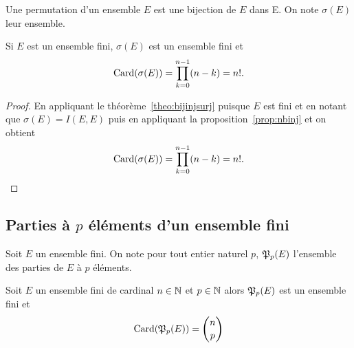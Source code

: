 \begin{defdef}
  Une permutation d'un ensemble \(E\) est une bijection de \(E\) dans E. On note 
  \(\sigma(E)\) leur ensemble.
\end{defdef}

\begin{prop}
  Si \(E\) est un ensemble fini, \(\sigma(E)\) est un ensemble fini et
  \begin{equation}
    \operatorname{Card}(\sigma(E)) = \prod_{k = 0}^{n - 1}(n - k) = n!.
  \end{equation}
\end{prop}

\begin{proof}
  En appliquant le théorème~\ref{theo:bijinjsurj} puisque \(E\) est fini et en 
  notant que \(\sigma(E) = I(E, E)\) puis en appliquant la 
  proposition~\ref{prop:nbinj} et on obtient
  \begin{equation}
    \operatorname{Card}(\sigma(E)) = \prod_{k = 0}^{n - 1}(n - k) = n!.
  \end{equation}
\end{proof}

\subsection{Parties à \(p\) éléments d'un ensemble fini}

Soit \(E\) un ensemble fini. On note pour tout entier naturel \(p\), 
\(\mathfrak{P}_p(E)\) l'ensemble des parties de \(E\) à \(p\) éléments.

\begin{prop}
  \label{prop:ppartiesfinies}
  Soit \(E\) un ensemble fini de cardinal \(n\in \mathbb{N}\) et \(p \in \mathbb{N}\) alors 
  \(\mathfrak{P}_p(E)\) est un ensemble fini et
  \begin{equation}
    \operatorname{Card}(\mathfrak{P}_p(E)) = \binom{n}{p}
  \end{equation}
\end{prop}

